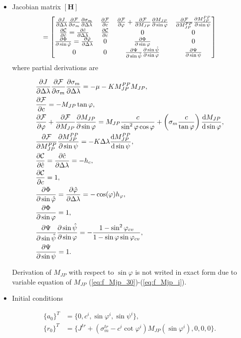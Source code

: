 \begin{itemize}
	\item Jacobian matrix $[\textbf{H}]$
	\begin{equation}
		[\text{\textbf{H}}] = \mqty[\pdv{J}{\Delta \lambda} \pdv{\mathcal{F}}{\sigma_m} \pdv{\sigma_m}{\Delta \lambda} & \pdv{\mathcal{F}}{c} & \pdv{\mathcal{F}}{\varphi} + \pdv{\mathcal{F}}{M_{JP}} \pdv{M_{JP}}{\sin \varphi} & \pdv{\mathcal{F}}{M_{JP}^{PP}} \pdv{M_{JP}^{PP}}{\sin \psi}\\
		\pdv{\mathcal{C}}{\hat{c}} = \pdv{\hat{c}}{\Delta \lambda} & \pdv{\mathcal{C}}{c} & 0 & 0\\
		\pdv{\mathrm{\Phi}}{\sin \hat{\varphi}} = \pdv{\hat{\varphi}}{\Delta \lambda} & 0 & \pdv{\mathrm{\Phi}}{\sin \varphi} & 0 \\
		0 & 0 & \pdv{\mathrm{\Psi}}{\sin \hat{\psi}} \pdv{\sin \hat{\psi}}{\sin \varphi} & \pdv{\mathrm{\Psi}}{\sin \psi}]
	\end{equation}
	where partial derivations are
	
	\begin{align}
		&\pdv{J}{\Delta \lambda} \pdv{\mathcal{F}}{\sigma_m} \pdv{\sigma_m}{\Delta \lambda}  = -\mu - K M_{JP}^{PP}M_{JP},\\
		&\pdv{\mathcal{F}}{c} = -M_{JP}\tan\varphi,\\
		&\pdv{\mathcal{F}}{\varphi} + \pdv{\mathcal{F}}{M_{JP}} \pdv{M_{JP}}{\sin \varphi} = M_{JP} \dfrac{c}{\sin^2\varphi \cos\varphi} + \left( \sigma_m \dfrac{c}{\tan \varphi} \right) \dv{M_{JP}}{\sin \varphi}, \\
		&\pdv{\mathcal{F}}{M_{JP}^{PP}} \pdv{M_{JP}^{PP}}{\sin \psi} = -K \Delta \lambda \dv{M_{JP}^{PP}}{\sin \psi},\\
		&\pdv{\mathcal{C}}{\hat{c}} = \pdv{\hat{c}}{\Delta \lambda} = -h_c, \\
		&\pdv{\mathcal{C}}{c} = 1,\\
		&\pdv{\mathrm{\Phi}}{\sin \hat{\varphi}} = \pdv{\hat{\varphi}}{\Delta \lambda} = -\cos(\varphi) h_{\varphi},\\
		&\pdv{\mathrm{\Phi}}{\sin \varphi} = 1,\\
		&\pdv{\mathrm{\Psi}}{\sin \hat{\psi}} \pdv{\sin \hat{\psi}}{\sin \varphi} = -\dfrac{1 - \sin^2\varphi_{cv} }{1-\sin \varphi \sin \varphi_{cv}},\\
		&\pdv{\mathrm{\Psi}}{\sin \psi} = 1.
	\end{align}
	
	Derivation of $M_{JP}$ with respect to $\sin \varphi$ is not writed in exact form due to variable equation of $M_{JP}$ (\ref{eq:f_Mjp_30})-(\ref{eq:f_Mjp_i}).
	
	\item Initial conditions
	
	\begin{align}
		\lbrace a_0 \rbrace^T &= \lbrace 0, c^i, \sin \varphi^i, \sin \psi^i \rbrace,\\
		\lbrace r_0 \rbrace^T &= \lbrace J^{tr} + (\sigma_m^{tr}-c^i\cot\varphi^i)M_{JP}(\sin\varphi^i), 0, 0, 0 \rbrace.
	\end{align}
	
\end{itemize} 

